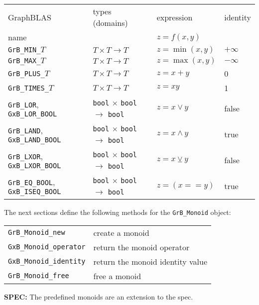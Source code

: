 \documentclass[12pt]{article}
\begin{document}
\vspace{0.2in}
{\footnotesize
\begin{tabular}{llll}
\hline
GraphBLAS             & types (domains)            & expression      & identity \\
name                  &                            & $z=f(x,y)$      & \\
\hline
\verb'GrB_MIN_'$T$    & $T \times T \rightarrow T$ & $z = \min(x,y)$ & $+\infty$ \\
\verb'GrB_MAX_'$T$    & $T \times T \rightarrow T$ & $z = \max(x,y)$ & $-\infty$ \\
\verb'GrB_PLUS_'$T$   & $T \times T \rightarrow T$ & $z = x+y$       & 0 \\
\verb'GrB_TIMES_'$T$  & $T \times T \rightarrow T$ & $z = xy$        & 1 \\
\hline
\verb'GrB_LOR', \verb'GxB_LOR_BOOL'      & \verb'bool' $\times$ \verb'bool' $\rightarrow$ \verb'bool' & $z = x \vee    y $ & false \\
\verb'GrB_LAND', \verb'GxB_LAND_BOOL'    & \verb'bool' $\times$ \verb'bool' $\rightarrow$ \verb'bool' & $z = x \wedge  y $ & true \\
\verb'GrB_LXOR', \verb'GxB_LXOR_BOOL'    & \verb'bool' $\times$ \verb'bool' $\rightarrow$ \verb'bool' & $z = x \veebar y $ & false \\
\verb'GrB_EQ_BOOL', \verb'GxB_ISEQ_BOOL' & \verb'bool' $\times$ \verb'bool' $\rightarrow$ \verb'bool' & $z =(x ==      y)$ & true  \\
\hline
\end{tabular}
}
\vspace{0.2in}

\noindent
The next sections define the following methods for the \verb'GrB_Monoid'
object:

\vspace{0.2in}
{\footnotesize
\begin{tabular}{ll}
\hline
\verb'GrB_Monoid_new'       & create a monoid \\
\verb'GxB_Monoid_operator'  & return the monoid operator \\
\verb'GxB_Monoid_identity'  & return the monoid identity value \\
\verb'GrB_Monoid_free'      & free a monoid \\
\hline
\end{tabular}
}
\vspace{0.2in}

\begin{spec}
{\bf SPEC:} The predefined monoids are an extension to the spec.
\end{spec}
\end{document}
